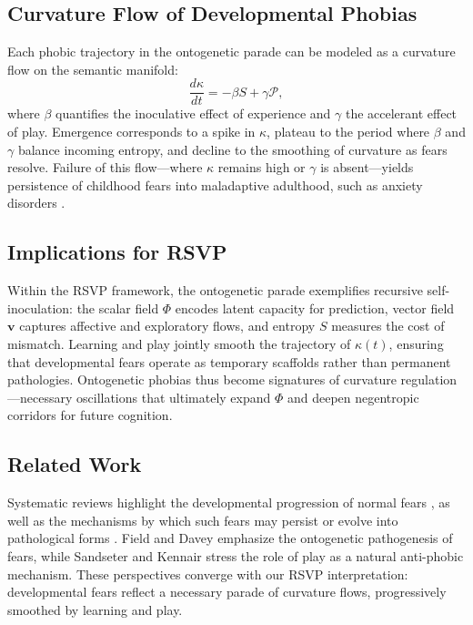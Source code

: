 \documentclass{article}
\theoremstyle{definition}
\begin{document}
\subsection{Curvature Flow of Developmental Phobias}

Each phobic trajectory in the ontogenetic parade can be modeled as a curvature
flow on the semantic manifold:
\[
\frac{d\kappa}{dt} = - \beta S + \gamma \mathcal{P},
\]
where $\beta$ quantifies the inoculative effect of experience and $\gamma$ the
accelerant effect of play. Emergence corresponds to a spike in $\kappa$, plateau
to the period where $\beta$ and $\gamma$ balance incoming entropy, and decline to
the smoothing of curvature as fears resolve. Failure of this flow---where
$\kappa$ remains high or $\gamma$ is absent---yields persistence of childhood
fears into maladaptive adulthood, such as anxiety disorders
\cite{king1998pathways}.

\subsection{Implications for RSVP}

Within the RSVP framework, the ontogenetic parade exemplifies recursive
self-inoculation: the scalar field $\Phi$ encodes latent capacity for prediction,
vector field $\mathbf{v}$ captures affective and exploratory flows, and entropy
$S$ measures the cost of mismatch. Learning and play jointly smooth the
trajectory of $\kappa(t)$, ensuring that developmental fears operate as
temporary scaffolds rather than permanent pathologies. Ontogenetic phobias thus
become signatures of curvature regulation---necessary oscillations that
ultimately expand $\Phi$ and deepen negentropic corridors for future cognition.

\subsection{Related Work}

Systematic reviews highlight the developmental progression of normal fears
\cite{muris2002ontogeny,gullone2003developmental}, as well as the mechanisms by
which such fears may persist or evolve into pathological forms
\cite{muris2000development,king1998pathways}. Field and Davey
\cite{field2001development} emphasize the ontogenetic pathogenesis of fears,
while Sandseter and Kennair \cite{sandseter2011children} stress the role of play
as a natural anti-phobic mechanism. These perspectives converge with our RSVP
interpretation: developmental fears reflect a necessary parade of curvature
flows, progressively smoothed by learning and play.
\end{document}
